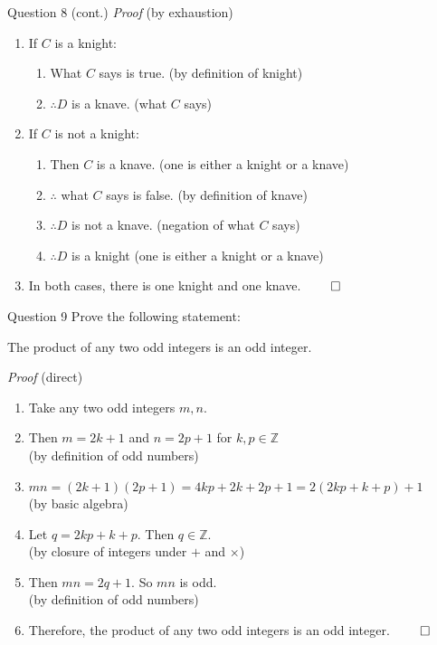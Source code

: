 \documentclass[10pt]{beamer}
\begin{document}
\begin{frame}[fragile]{Question 8 (cont.)}
    \textit{Proof} (by exhaustion)
\begin{enumerate}
    \item If $C$ is a knight:
    \begin{enumerate}
        \item What $C$ says is true. (by definition of knight)
        \item $\therefore D$ is a knave. (what $C$ says)
    \end{enumerate}
    \item If $C$ is not a knight:
    \begin{enumerate}
        \item Then $C$ is a knave. (one is either a knight or a knave)
        \item $\therefore$ what $C$ says is false. (by definition of knave)
        \item $\therefore D$ is not a knave. (negation of what $C$ says)
        \item $\therefore D$ is a knight (one is either a knight or a knave)
    \end{enumerate}
    \item In both cases, there is one knight and one knave. $\qed$
\end{enumerate}
\end{frame}

\begin{frame}[fragile]{Question 9}
    Prove the following statement:
\begin{center}
    The product of any two odd integers is an odd integer.
\end{center}
    \textit{Proof} (direct)
\begin{enumerate}
    \item Take any two odd integers $m, n$.
    \item Then $m = 2k + 1$ and $n = 2p + 1$ for $k, p \in \mathbb{Z}$\\
    (by definition of odd numbers)
    \item $mn = (2k + 1)(2p + 1) = 4kp + 2k + 2p + 1 = 2(2kp + k + p) + 1$\\
    (by basic algebra)
    \item Let $q = 2kp + k + p$. Then $q \in \mathbb{Z}$.\\
    (by closure of integers under $+$ and $\times$)
    \item Then $mn = 2q + 1$. So $mn$ is odd.\\
    (by definition of odd numbers)
    \item Therefore, the product of any two odd integers is an odd integer. $\qed$
\end{enumerate}
\end{frame}
\end{document}
